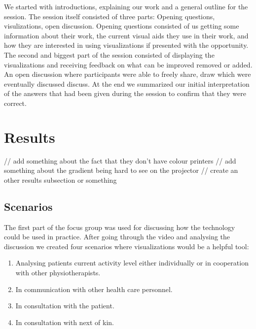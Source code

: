 We started with introductions, explaining our work and a general outline for the session. The session itself consisted of three parts: Opening questions, visulizations, open discussion. Opening questions consisted of us getting some information about their work, the current visual aids they use in their work, and how they are interested in using visualizations if presented with the opportunity. The second and biggest part of the session consisted of displaying the visualizations and receiving feedback on what can be improved removed or added. An open discussion where participants were able to freely share, draw which were eventually discussed discuss. At the end we summarized our initial interpretation of the answers that had been given during the session to confirm that they were correct.

\section{Results}

// add something about the fact that they don't have colour printers
// add something about the gradient being hard to see on the projector
// create an other results subsection or something

\subsection{Scenarios}
The first part of the focus group was used for discussing how the technology could be used in practice. After going through the video and analysing the discussion we created four scenarios where visualizations would be a helpful tool: 
\vspace{-6mm}
\begin{enumerate}[itemsep=0cm, parsep=0cm]
\item Analysing patients current activity level either individually or in cooperation with other physiotherapists.
\item In communication with other health care personnel.
\item In consultation with the patient.
\item In consultation with next of kin.
\end{enumerate}

